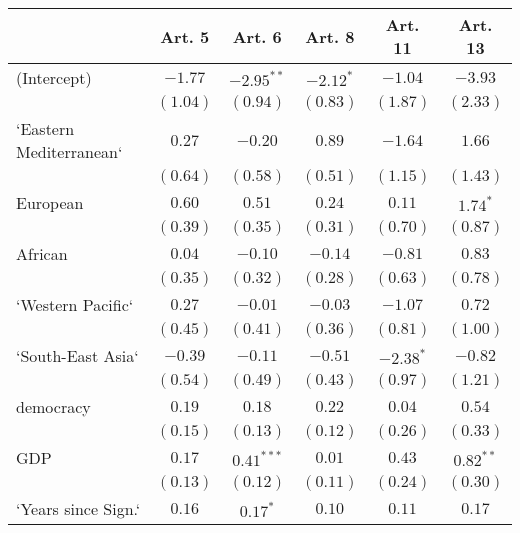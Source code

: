 
\begin{table}[!h]
\begin{center}
\begin{tabular}{l c c c c c }
\toprule
 & Art. 5 & Art. 6 & Art. 8 & Art. 11 & Art. 13 \\
\midrule
(Intercept)             & $-1.77$      & $-2.95^{**}$ & $-2.12^{*}$  & $-1.04$      & $-3.93$      \\
                        & $(1.04)$     & $(0.94)$     & $(0.83)$     & $(1.87)$     & $(2.33)$     \\
`Eastern Mediterranean` & $0.27$       & $-0.20$      & $0.89$       & $-1.64$      & $1.66$       \\
                        & $(0.64)$     & $(0.58)$     & $(0.51)$     & $(1.15)$     & $(1.43)$     \\
European                & $0.60$       & $0.51$       & $0.24$       & $0.11$       & $1.74^{*}$   \\
                        & $(0.39)$     & $(0.35)$     & $(0.31)$     & $(0.70)$     & $(0.87)$     \\
African                 & $0.04$       & $-0.10$      & $-0.14$      & $-0.81$      & $0.83$       \\
                        & $(0.35)$     & $(0.32)$     & $(0.28)$     & $(0.63)$     & $(0.78)$     \\
`Western Pacific`       & $0.27$       & $-0.01$      & $-0.03$      & $-1.07$      & $0.72$       \\
                        & $(0.45)$     & $(0.41)$     & $(0.36)$     & $(0.81)$     & $(1.00)$     \\
`South-East Asia`       & $-0.39$      & $-0.11$      & $-0.51$      & $-2.38^{*}$  & $-0.82$      \\
                        & $(0.54)$     & $(0.49)$     & $(0.43)$     & $(0.97)$     & $(1.21)$     \\
democracy               & $0.19$       & $0.18$       & $0.22$       & $0.04$       & $0.54$       \\
                        & $(0.15)$     & $(0.13)$     & $(0.12)$     & $(0.26)$     & $(0.33)$     \\
GDP                     & $0.17$       & $0.41^{***}$ & $0.01$       & $0.43$       & $0.82^{**}$  \\
                        & $(0.13)$     & $(0.12)$     & $(0.11)$     & $(0.24)$     & $(0.30)$     \\
`Years since Sign.`     & $0.16$       & $0.17^{*}$   & $0.10$       & $0.11$       & $0.17$       \\

\end{tabular}
\end{center}
\end{table}
